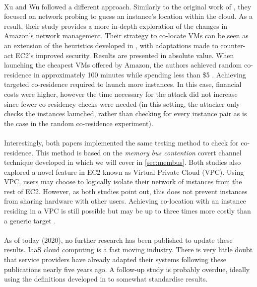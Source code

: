 \documentclass[orivec,envcountsame, a4paper, 11pt]{llncs}
\begin{document}
\paragraph{} Xu and Wu \cite{Xu2015} followed a different approach. Similarly to the original work of \cite{Ristenpart2009}, they focused on network probing to guess an instance's location within the cloud. As a result, their study provides a more in-depth exploration of the changes in Amazon's network management. Their strategy to co-locate VMs can be seen as an extension of the heuristics developed in \cite{Ristenpart2009}, with adaptations made to counter-act EC2's improved security. Results are presented in absolute value. When launching the cheapest VMs offered by Amazon, the authors achieved random co-residence in approximately 100 minutes while spending less than \$5 \cite{Xu2015}. Achieving targeted co-residence required to launch more instances. In this case, financial costs were higher, however the time necessary for the attack did not increase since fewer co-residency checks were needed (in this setting, the attacker only checks the instances launched, rather than checking for every instance pair as is the case in the random co-residence experiment).

\paragraph{} Interestingly, both papers implemented the same testing method to check for co-residence. This method is based on the \textit{memory bus contention} covert channel technique developed in \cite{Wu2012} which we will cover in \autoref{sec:membus}. Both studies also explored a novel feature in EC2 known as Virtual Private Cloud (VPC). Using VPC, users may choose to logically isolate their network of instances from the rest of EC2. However, as both studies point out, this does not prevent instances from sharing hardware with other users. Achieving co-location with an instance residing in a VPC is still possible but may be up to three times more costly than a generic target \cite{Xu2015}.

\paragraph{} As of today (2020), no further research has been published to update these results. IaaS cloud computing is a fast moving industry. There is very little doubt that service providers have already adapted their systems following these publications nearly five years ago. A follow-up study is probably overdue, ideally using the definitions developed in \cite{Varadarajan2015} to somewhat standardise results.
\end{document}
